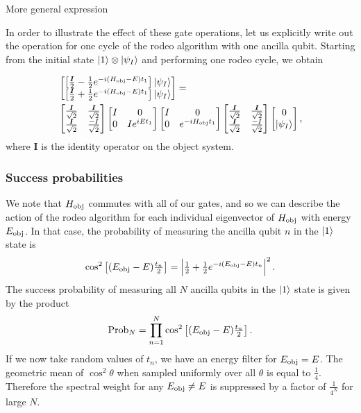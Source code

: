 \documentclass{beamer}
\begin{document}
\begin{frame}{More general expression}

In order to illustrate the effect of these gate operations, let us
explicitly write out the operation for one cycle of the rodeo
algorithm with one ancilla qubit.  Starting from the initial state
$\ket{1} \otimes \ket{\psi_I}$ and performing one rodeo cycle, we
obtain


\begin{align*}
& \begin{bmatrix}
\left[ \tfrac{\bm{I}}{2}-\tfrac{1}{2}e^{-i(H_{\rm obj}-E)t_1} \right] \ket{\psi_I} \\
\left[ \tfrac{\bm{I}}{2}+\tfrac{1}{2}e^{-i(H_{\rm obj}-E)t_1} \right] \ket{\psi_I}
\end{bmatrix} =  \nonumber \\
& \begin{bmatrix}
\tfrac{\bm{I}}{\sqrt{2}} &
\tfrac{\bm{I}}{\sqrt{2}}\\
\tfrac{\bm{I}}{\sqrt{2}}& 
\tfrac{-I}{\sqrt{2}}
\end{bmatrix}
\begin{bmatrix}
 I & 0 \\
0 & Ie^{iEt_1} 
\end{bmatrix}
 \begin{bmatrix}
 I & 0 \\
0 & e^{-iH_{\rm obj}t_1}
\end{bmatrix} 
\begin{bmatrix}
\tfrac{\bm{I}}{\sqrt{2}} & 
\tfrac{\bm{I}}{\sqrt{2}}\\
\tfrac{\bm{I}}{\sqrt{2}} & 
\tfrac{-I}{\sqrt{2}}
\end{bmatrix}
\begin{bmatrix}
0 \\
\ket{\psi_I}
\end{bmatrix},
\label{one_rodeo}
\end{align*}
where $\bm{I}$ is the identity operator on the object system.


\end{frame}



\begin{frame}
\frametitle{Success probabilities}
We note that $H_{\rm obj}$ commutes with all of our gates, and so we can describe the action of the rodeo algorithm for each individual eigenvector of $H_{\rm obj}$ with energy $E_{\rm obj}$.  In that case, the probability of measuring the ancilla qubit $n$ in the $\ket{1}$ state is 
\[
   \cos^2\left[(E_{\rm obj}
   -E)\tfrac{t_n}{2}\right] = \left\vert \tfrac{1}{2}+
   \tfrac{1}{2}e^{-i(E_{\rm obj}-E)t_n} \right\vert^2.
\]
The success probability of measuring all $N$ ancilla qubits in the $\ket{1}$ state is given by the product 
\[
   \mathrm{Prob}_N =\prod_{n=1}^N \cos^2\left[(E_{\rm obj}
   -E)\tfrac{t_n}{2}\right]. 
\]
If we now take random values of $t_n$, we have an energy filter for $E_{\rm obj}=E$.  The geometric mean of $\cos^2\theta$ when sampled uniformly over all $\theta$ is equal to $\tfrac{1}{4}$.  Therefore the spectral weight for any $E_{\rm obj}\ne E$ is suppressed by a factor of $\tfrac{1}{4^N}$ for large $N$.


\end{frame}
\end{document}
